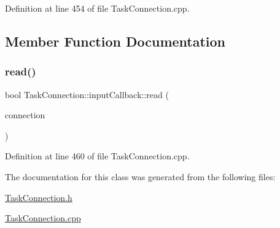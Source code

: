 Definition at line 454 of file Task\+Connection.\+cpp.



\subsection{Member Function Documentation}
\hypertarget{classocra__recipes_1_1TaskConnection_1_1inputCallback_a6572ca3aa11c347ecd414ea760ae89bc}{}\label{classocra__recipes_1_1TaskConnection_1_1inputCallback_a6572ca3aa11c347ecd414ea760ae89bc} 
\subsubsection{\texorpdfstring{read()}{read()}}
{\footnotesize\ttfamily bool Task\+Connection\+::input\+Callback\+::read (\begin{DoxyParamCaption}\item[{yarp\+::os\+::\+Connection\+Reader \&}]{connection }\end{DoxyParamCaption})\hspace{0.3cm}{\ttfamily [virtual]}}



Definition at line 460 of file Task\+Connection.\+cpp.



The documentation for this class was generated from the following files\+:\begin{DoxyCompactItemize}
\item 
\hyperlink{TaskConnection_8h}{Task\+Connection.\+h}\item 
\hyperlink{TaskConnection_8cpp}{Task\+Connection.\+cpp}\end{DoxyCompactItemize}
